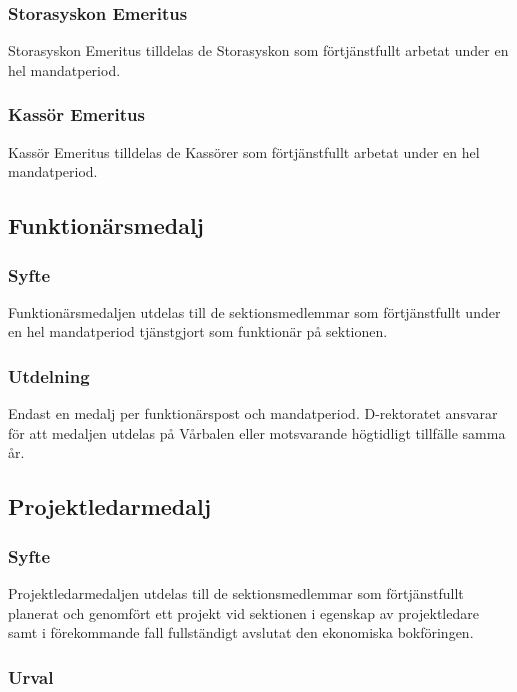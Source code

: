 \documentclass{dgovdoc}
\begin{document}
\subsubsection{Storasyskon Emeritus}

Storasyskon Emeritus tilldelas de Storasyskon som förtjänstfullt arbetat under
en hel mandatperiod.

\subsubsection{Kassör Emeritus}

Kassör Emeritus tilldelas de Kassörer som förtjänstfullt arbetat under
en hel mandatperiod.

\subsection{Funktionärsmedalj}

\subsubsection{Syfte}

Funktionärsmedaljen utdelas till de sektionsmedlemmar som förtjänstfullt under
en hel mandatperiod tjänstgjort som funktionär på sektionen.

\subsubsection{Utdelning}

Endast en medalj per funktionärspost och mandatperiod. D-rektoratet ansvarar för att medaljen utdelas på
Vårbalen eller motsvarande högtidligt tillfälle samma år.

\subsection{Projektledarmedalj}

\subsubsection{Syfte}

Projektledarmedaljen utdelas till de sektionsmedlemmar som förtjänstfullt
planerat och genomfört ett projekt vid sektionen i egenskap av projektledare
samt i förekommande fall fullständigt avslutat den ekonomiska bokföringen.

\subsubsection{Urval}
\end{document}
